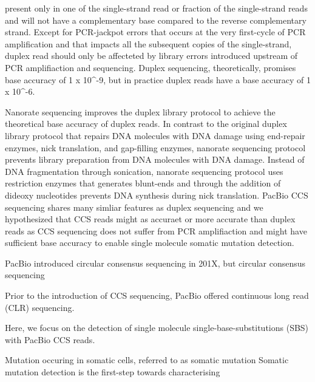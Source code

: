 present only in one of the single-strand read or fraction of the single-strand reads and will not have a complementary base compared to the reverse complementary strand. Except for PCR-jackpot errors that occurs at the very first-cycle of PCR amplification and that impacts all the subsequent copies of the single-strand, duplex read should only be affecteted by library errors introduced upstream of PCR amplifiaction and sequencing. Duplex sequencing, theoretically, promises base accuracy of 1 x 10^-9, but in practice duplex reads have a base accuracy of 1 x 10^-6. 

Nanorate sequencing improves the duplex library protocol to achieve the theoretical base accuracy of duplex reads. In contrast to the original duplex library protocol that repairs DNA molecules with DNA damage using end-repair enzymes, nick translation, and gap-filling enzymes, nanorate sequencing protocol prevents library preparation from DNA molecules with DNA damage. Instead of DNA fragmentation through sonication, nanorate sequencing protocol uses restriction enzymes that generates blunt-ends and through the addition of dideoxy nucleotides prevents DNA synthesis during nick translation. PacBio CCS sequencing shares many simliar features as duplex sequencing and we hypothesized that CCS reads might as accuraet or more accurate than duplex reads as CCS sequencing does not suffer from PCR amplifiaction and might have sufficient base accuracy to enable single molecule somatic mutation detection.


PacBio introduced circular consensus sequencing in 201X, but circular consensus sequencing  

Prior to the introduction of CCS sequencing, PacBio offered continuous long read (CLR) sequencing.

Here, we focus on the detection of single molecule single-base-substitutions (SBS) with PacBio CCS reads. 


Mutation occuring in somatic cells, referred to as somatic mutation
Somatic mutation detection is the first-step towards characterising




